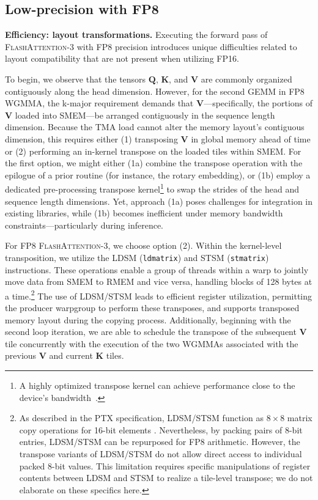 \begin{enumerate}
\begin{algorithm}[H]
\begin{algorithmic}[1]
\subsection{Low-precision with FP8}
\label{sec:algofp8}

\textbf{Efficiency: layout transformations.} Executing the forward pass of \textsc{FlashAttention-3} with FP8 precision introduces unique difficulties related to layout compatibility that are not present when utilizing FP16.

To begin, we observe that the tensors $\mathbf{Q}$, $\mathbf{K}$, and $\mathbf{V}$ are commonly organized contiguously along the head dimension. However, for the second GEMM in FP8 WGMMA, the k-major requirement demands that $\mathbf{V}$—specifically, the portions of $\mathbf{V}$ loaded into SMEM—be arranged contiguously in the sequence length dimension. Because the TMA load cannot alter the memory layout's contiguous dimension, this requires either (1) transposing $\mathbf{V}$ in global memory ahead of time or (2) performing an in-kernel transpose on the loaded tiles within SMEM. For the first option, we might either (1a) combine the transpose operation with the epilogue of a prior routine (for instance, the rotary embedding), or (1b) employ a dedicated pre-processing transpose kernel\footnote{A highly optimized transpose kernel can achieve performance close to the device’s bandwidth~\citep{colfax_cutlass_transpose_2024}.} to swap the strides of the head and sequence length dimensions. Yet, approach (1a) poses challenges for integration in existing libraries, while (1b) becomes inefficient under memory bandwidth constraints—particularly during inference.

For FP8 \textsc{FlashAttention-3}, we choose option (2). Within the kernel-level transposition, we utilize the LDSM (\verb|ldmatrix|) and STSM (\verb|stmatrix|) instructions. These operations enable a group of threads within a warp to jointly move data from SMEM to RMEM and vice versa, handling blocks of 128 bytes at a time.\footnote{As described in the PTX specification, LDSM/STSM function as $8 \times 8$ matrix copy operations for 16-bit elements \cite[\S 9.7.13.4.15-16]{ptx}. Nevertheless, by packing pairs of 8-bit entries, LDSM/STSM can be repurposed for FP8 arithmetic. However, the transpose variants of LDSM/STSM do not allow direct access to individual packed 8-bit values. This limitation requires specific manipulations of register contents between LDSM and STSM to realize a tile-level transpose; we do not elaborate on these specifics here.} The use of LDSM/STSM leads to efficient register utilization, permitting the producer warpgroup to perform these transposes, and supports transposed memory layout during the copying process. Additionally, beginning with the second loop iteration, we are able to schedule the transpose of the subsequent $\mathbf{V}$ tile concurrently with the execution of the two WGMMAs associated with the previous $\mathbf{V}$ and current $\mathbf{K}$ tiles.


\end{algorithmic}
\end{algorithm}
\end{enumerate}

